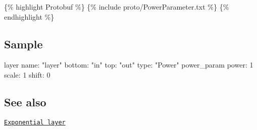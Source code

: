 \{\% highlight Protobuf \%\} \{\% include proto/\+Power\+Parameter.\+txt \%\} \{\% endhighlight \%\}

\subsection*{Sample}

\begin{DoxyVerb}  layer {
    name: "layer"
    bottom: "in"
    top: "out"
    type: "Power"
    power_param {
      power: 1
      scale: 1
      shift: 0
    }
  }
\end{DoxyVerb}


\subsection*{See also}


\begin{DoxyItemize}
\item \href{exp.html}{\tt Exponential layer} 
\end{DoxyItemize}
